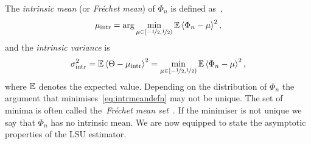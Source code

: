 \documentclass[journal]{IEEEtran}
\begin{document}
The \emph{intrinsic mean} (or \emph{Fr\'{e}chet mean}) of $\Phi_n$ is defined as~\cite{McKilliam_mean_dir_est_sq_arc_length2010,Bhattacharya_int_ext_means_2003},
\begin{equation}\label{eq:intrmeandefn}
 \mu_{\text{intr}}  = \arg \min_{\mu \in [-\nicefrac{1}{2}, \nicefrac{1}{2})} {\mathbb E} \left\langle \Phi_n - \mu \right\rangle^2, 
\end{equation}
and the \emph{intrinsic variance} is
\[
\sigma_{\text{intr}}^2 = {\mathbb E}\left\langle \Theta - \mu_{\text{intr}} \right\rangle^2 = \min_{\mu \in [-\nicefrac{1}{2}, \nicefrac{1}{2})} {\mathbb E} \left\langle \Phi_n - \mu \right\rangle^2,
\]
where ${\mathbb E}$ denotes the expected value.  Depending on the distribution of $\Phi_n$ the argument that minimises~\eqref{eq:intrmeandefn} may not be unique.  The set of minima is often called the~\emph{Fr\'{e}chet mean set}~\cite{Bhattacharya_int_ext_means_2003,Bhattacharya_int_ext_means_2005}.  If the minimiser is not unique we say that $\Phi_n$ has no intrinsic mean.  We are now equipped to state the asymptotic properties of the LSU estimator.


 
\end{document}
